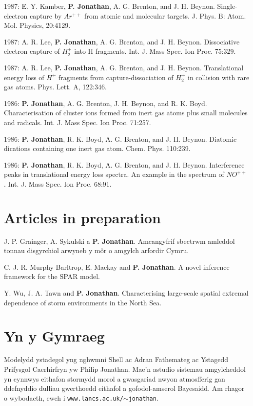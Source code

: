 \documentclass[11pt,a4paper]{moderncv}
\begin{document}
1987: E. Y. Kamber, \textbf{P. Jonathan}, A. G. Brenton, and J. H. Beynon. Single-electron capture by $Ar^{++}$ from atomic and molecular targets. J. Phys. B: Atom. Mol. Physics, 20:4129.

1987: A. R. Lee, \textbf{P. Jonathan}, A. G. Brenton, and J. H. Beynon. Dissociative electron capture of $H_2^+$ into H fragments. Int. J. Mass Spec. Ion Proc. 75:329.

1987: A. R. Lee, \textbf{P. Jonathan}, A. G. Brenton, and J. H. Beynon. Translational energy loss of $H^+$ fragments from capture-dissociation of $H_2^+$ in collision with rare gas atoms. Phys. Lett. A, 122:346.

1986: \textbf{P. Jonathan}, A. G. Brenton, J. H. Beynon, and R. K. Boyd. Characterisation of cluster ions formed from inert gas atoms plus small molecules and radicals. Int. J. Mass Spec. Ion Proc. 71:257.

1986: \textbf{P. Jonathan}, R. K. Boyd, A. G. Brenton, and J. H. Beynon. Diatomic dications containing one inert gas atom. Chem. Phys. 110:239.

1986: \textbf{P. Jonathan}, R. K. Boyd, A. G. Brenton, and J. H. Beynon. Interference peaks in translational energy loss spectra. An example in the spectrum of $NO^{++}$ . Int. J. Mass Spec. Ion Proc. 68:91.

\setlength{\parskip}{0em}

\section{Articles in preparation}

\setlength{\parskip}{0.5em}

J. P. Grainger, A. Sykulski a \textbf{P. Jonathan}. Amcangyfrif sbectrwm amleddol tonnau disgyrchiol arwyneb y m\^or o amgylch arfordir Cymru.

C. J. R. Murphy-Barltrop, E. Mackay and \textbf{P. Jonathan}. A novel inference framework for the SPAR model.

Y. Wu, J. A. Tawn and \textbf{P. Jonathan}. Characterising large-scale spatial extremal dependence of storm environments in the North Sea.

\setlength{\parskip}{0em}

\section{Yn y Gymraeg}
Modelydd ystadegol yng nghwmni Shell ac Adran Fathemateg ac Ystagedd Prifysgol Caerhirfryn yw Philip Jonathan. Mae'n astudio sistemau amgylcheddol yn cynnwys eithafon stormydd morol a gwasgariad nwyon atmosfferig gan ddefnyddio dulliau gwerthoedd eithafol a gofodol-amserol Bayesaidd. Am rhagor o wybodaeth, ewch i \texttt{www.lancs.ac.uk/$\sim$jonathan}.

\clearpage
\end{document}
